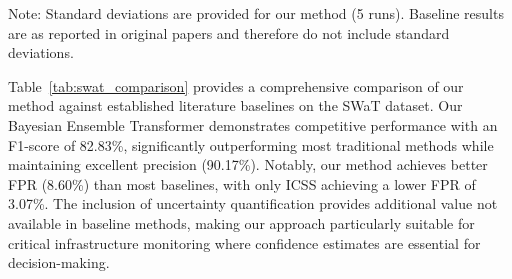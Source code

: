 \documentclass[journal]{IEEEtran}
\begin{document}
\begin{table}[t]
\centering
\caption{Anomaly Detection Performance Comparison on SWaT Dataset - FPR(\%), Precision(\%), Recall(\%), and F1-Score(\%) of Our Model with Baseline Methods}
\label{tab:swat_comparison}
\footnotesize{Note: Standard deviations are provided for our method (5 runs). Baseline results are as reported in original papers and therefore do not include standard deviations.}
\end{table}

Table~\ref{tab:swat_comparison} provides a comprehensive comparison of our method against established literature baselines on the SWaT dataset. Our Bayesian Ensemble Transformer demonstrates competitive performance with an F1-score of 82.83\%, significantly outperforming most traditional methods while maintaining excellent precision (90.17\%). Notably, our method achieves better FPR (8.60\%) than most baselines, with only ICSS achieving a lower FPR of 3.07\%. The inclusion of uncertainty quantification provides additional value not available in baseline methods, making our approach particularly suitable for critical infrastructure monitoring where confidence estimates are essential for decision-making.
\end{document}
